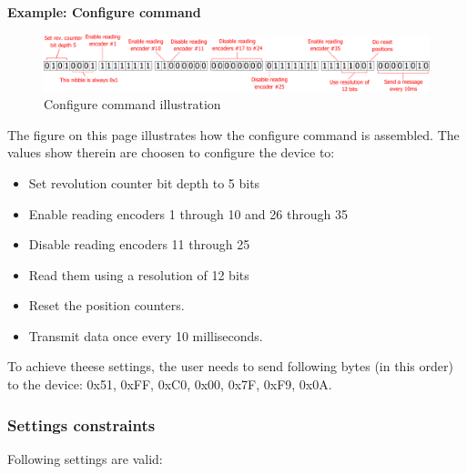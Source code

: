 \documentclass[twoside]{article}
\begin{document}
\textbf{Example: Configure command}

\begin{figure}[htb]
	\centering
	\includegraphics[width=1.0\textwidth]{figs/bits}
	\caption{Configure command illustration}
	\label{fig:config}
\end{figure}

The figure on this page illustrates how the configure command is assembled. The values show therein are choosen to configure the device to:

\begin{itemize}
\item Set revolution counter bit depth to 5 bits
\item Enable reading encoders 1 through 10 and 26 through 35
\item Disable reading encoders 11 through 25
\item Read them using a resolution of 12 bits
\item Reset the position counters.
\item Transmit data once every 10 milliseconds.
\end{itemize}

To achieve theese settings, the user needs to send following bytes (in this order) to the device: 0x51, 0xFF, 0xC0, 0x00, 0x7F, 0xF9, 0x0A.

\subsubsection{Settings constraints}

Following settings are valid:
\end{document}
